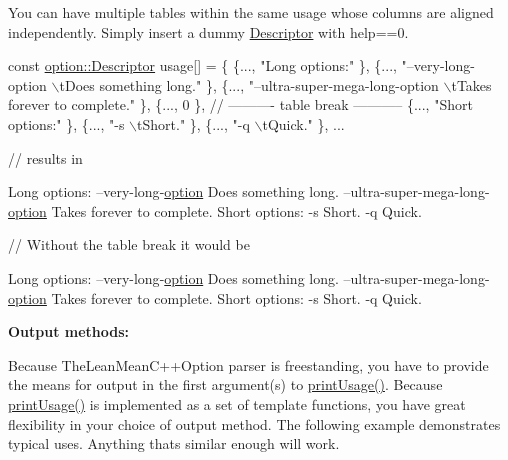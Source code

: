 You can have multiple tables within the same usage whose columns are aligned independently. Simply insert a dummy \hyperlink{structoption_1_1Descriptor}{Descriptor} with {\ttfamily help==0}.


\begin{DoxyCode}
\textcolor{keyword}{const} \hyperlink{structoption_1_1Descriptor}{option::Descriptor} usage[] = \{
\{..., \textcolor{stringliteral}{"Long options:"} \},
\{..., \textcolor{stringliteral}{"--very-long-option  \(\backslash\)tDoes something long."} \},
\{..., \textcolor{stringliteral}{"--ultra-super-mega-long-option  \(\backslash\)tTakes forever to complete."} \},
\{..., 0 \}, \textcolor{comment}{// ---------- table break -----------}
\{..., \textcolor{stringliteral}{"Short options:"} \},
\{..., \textcolor{stringliteral}{"-s  \(\backslash\)tShort."} \},
\{..., \textcolor{stringliteral}{"-q  \(\backslash\)tQuick."} \}, ...

\textcolor{comment}{// results in}

Long options:
--very-\textcolor{keywordtype}{long}-\hyperlink{namespaceoption}{option}              Does something \textcolor{keywordtype}{long}.
--ultra-super-mega-\textcolor{keywordtype}{long}-\hyperlink{namespaceoption}{option}  Takes forever to complete.
Short options:
-s  Short.
-q  Quick.

\textcolor{comment}{// Without the table break it would be}

Long options:
--very-\textcolor{keywordtype}{long}-\hyperlink{namespaceoption}{option}              Does something \textcolor{keywordtype}{long}.
--ultra-super-mega-\textcolor{keywordtype}{long}-\hyperlink{namespaceoption}{option}  Takes forever to complete.
Short options:
-s                              Short.
-q                              Quick.
\end{DoxyCode}


{\bfseries Output methods\+:}

Because The\+Lean\+Mean\+C++\+Option parser is freestanding, you have to provide the means for output in the first argument(s) to \hyperlink{namespaceoption_afc8bb7e040a98a0b33ff1ce9da1be0d1}{print\+Usage()}. Because \hyperlink{namespaceoption_afc8bb7e040a98a0b33ff1ce9da1be0d1}{print\+Usage()} is implemented as a set of template functions, you have great flexibility in your choice of output method. The following example demonstrates typical uses. Anything that\textquotesingle{}s similar enough will work.


